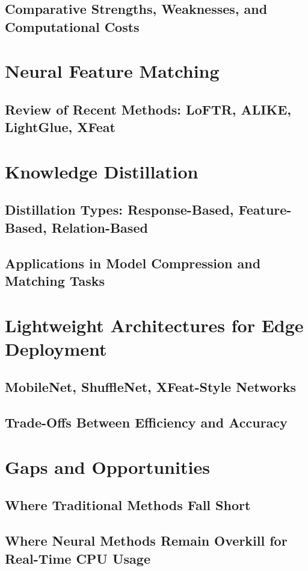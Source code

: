 \documentclass[a4paper,12pt]{report}
\begin{document}
\subsection{Comparative Strengths, Weaknesses, and Computational Costs}

\section{Neural Feature Matching}
\subsection{Review of Recent Methods: LoFTR, ALIKE, LightGlue, XFeat}

\section{Knowledge Distillation}
\subsection{Distillation Types: Response-Based, Feature-Based, Relation-Based}
\subsection{Applications in Model Compression and Matching Tasks}

\section{Lightweight Architectures for Edge Deployment}
\subsection{MobileNet, ShuffleNet, XFeat-Style Networks}
\subsection{Trade-Offs Between Efficiency and Accuracy}

\section{Gaps and Opportunities}
\subsection{Where Traditional Methods Fall Short}
\subsection{Where Neural Methods Remain Overkill for Real-Time CPU Usage}
\end{document}
